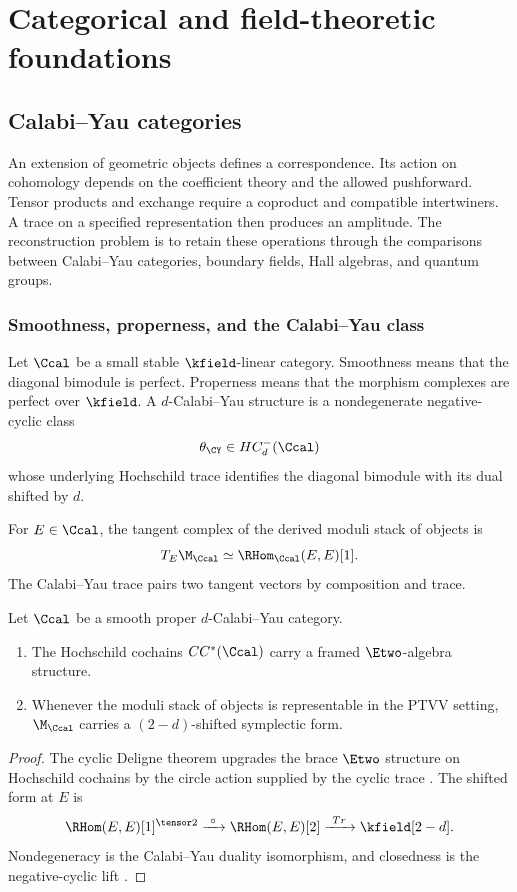 \part{Categorical and field-theoretic foundations}

\chapter{Calabi--Yau categories}
\begin{summarybox}
An extension of geometric objects defines a correspondence. Its action on cohomology depends on the coefficient theory and the allowed pushforward. Tensor products and exchange require a coproduct and compatible intertwiners. A trace on a specified representation then produces an amplitude. The reconstruction problem is to retain these operations through the comparisons between Calabi--Yau categories, boundary fields, Hall algebras, and quantum groups.
\end{summarybox}

\section{Smoothness, properness, and the Calabi--Yau class}
Let $\Ccal$ be a small stable $\kfield$-linear category. Smoothness means that the diagonal bimodule is perfect. Properness means that the morphism complexes are perfect over $\kfield$. A $d$-Calabi--Yau structure is a nondegenerate negative-cyclic class
\[
 \theta_{\CY}\in HC^-_d(\Ccal)
\]
whose underlying Hochschild trace identifies the diagonal bimodule with its dual shifted by $d$.

For $E\in\Ccal$, the tangent complex of the derived moduli stack of objects is
\[
 T_E\M_{\Ccal}\simeq\RHom_{\Ccal}(E,E)[1].
\]
The Calabi--Yau trace pairs two tangent vectors by composition and trace.

\begin{theorem}
Let $\Ccal$ be a smooth proper $d$-Calabi--Yau category.
\begin{enumerate}
\item The Hochschild cochains $CC^*(\Ccal)$ carry a framed $\Etwo$-algebra structure.
\item Whenever the moduli stack of objects is representable in the PTVV setting, $\M_{\Ccal}$ carries a $(2-d)$-shifted symplectic form.
\end{enumerate}
\end{theorem}
\begin{proof}
The cyclic Deligne theorem upgrades the brace $\Etwo$ structure on Hochschild cochains by the circle action supplied by the cyclic trace \cite{BravRozenblyum}. The shifted form at $E$ is
\[
 \RHom(E,E)[1]^{\tensor2}
 \xrightarrow{\ \circ\ }
 \RHom(E,E)[2]
 \xrightarrow{\ \Tr\ }
 \kfield[2-d].
\]
Nondegeneracy is the Calabi--Yau duality isomorphism, and closedness is the negative-cyclic lift \cite{PTVV,BravDyckerhoff}.
\end{proof}

